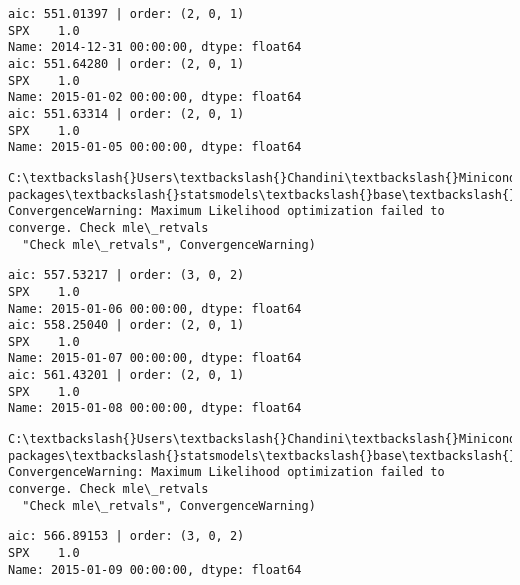\documentclass[11pt]{article}
\begin{document}
    \begin{Verbatim}[commandchars=\\\{\}]
aic: 551.01397 | order: (2, 0, 1)
SPX    1.0
Name: 2014-12-31 00:00:00, dtype: float64
aic: 551.64280 | order: (2, 0, 1)
SPX    1.0
Name: 2015-01-02 00:00:00, dtype: float64
aic: 551.63314 | order: (2, 0, 1)
SPX    1.0
Name: 2015-01-05 00:00:00, dtype: float64

    \end{Verbatim}

    \begin{Verbatim}[commandchars=\\\{\}]
C:\textbackslash{}Users\textbackslash{}Chandini\textbackslash{}Miniconda3\textbackslash{}envs\textbackslash{}auquan\textbackslash{}lib\textbackslash{}site-packages\textbackslash{}statsmodels\textbackslash{}base\textbackslash{}model.py:496: ConvergenceWarning: Maximum Likelihood optimization failed to converge. Check mle\_retvals
  "Check mle\_retvals", ConvergenceWarning)

    \end{Verbatim}

    \begin{Verbatim}[commandchars=\\\{\}]
aic: 557.53217 | order: (3, 0, 2)
SPX    1.0
Name: 2015-01-06 00:00:00, dtype: float64
aic: 558.25040 | order: (2, 0, 1)
SPX    1.0
Name: 2015-01-07 00:00:00, dtype: float64
aic: 561.43201 | order: (2, 0, 1)
SPX    1.0
Name: 2015-01-08 00:00:00, dtype: float64

    \end{Verbatim}

    \begin{Verbatim}[commandchars=\\\{\}]
C:\textbackslash{}Users\textbackslash{}Chandini\textbackslash{}Miniconda3\textbackslash{}envs\textbackslash{}auquan\textbackslash{}lib\textbackslash{}site-packages\textbackslash{}statsmodels\textbackslash{}base\textbackslash{}model.py:496: ConvergenceWarning: Maximum Likelihood optimization failed to converge. Check mle\_retvals
  "Check mle\_retvals", ConvergenceWarning)

    \end{Verbatim}

    \begin{Verbatim}[commandchars=\\\{\}]
aic: 566.89153 | order: (3, 0, 2)
SPX    1.0
Name: 2015-01-09 00:00:00, dtype: float64

    \end{Verbatim}
\end{document}
